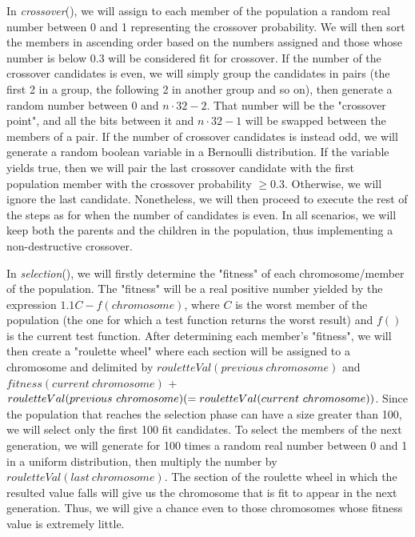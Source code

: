 \documentclass[a4paper]{article}
\begin{document}
In {\itshape crossover}(), we will assign to each member of the population a random real number between 0 and 1 representing the crossover probability. We will then sort the members in ascending order based on the numbers assigned and those whose number is below $0.3$ will be considered fit for crossover. If the number of the crossover candidates is even, we will simply group the candidates in pairs (the first 2 in a group, the following 2 in another group and so on), then generate a random number between $0$ and $n \cdot 32 - 2$. That number will be the "crossover point", and all the bits between it and $n \cdot 32 -1$ will be swapped between the members of a pair. If the number of crossover candidates is instead odd, we will generate a random boolean variable in a Bernoulli distribution. If the variable yields true, then we will pair the last crossover candidate with the first population member with the crossover probability $\geq 0.3$. Otherwise, we will ignore the last candidate. Nonetheless, we will then proceed to execute the rest of the steps as for when the number of candidates is even. In all scenarios, we will keep both the parents and the children in the population, thus implementing a non-destructive crossover.

In {\itshape selection}(), we will firstly determine the "fitness" of each chromosome/member of the population. The "fitness" will be a real positive number yielded by the expression $1.1 C - f(chromosome)$, where $C$ is the worst member of the population (the one for which a test function returns the worst result) and $f()$ is the current test function. After determining each member's "fitness", we will then create a "roulette wheel" where each section will be assigned \linebreak to a chromosome and delimited by $ rouletteVal(previous\ chromosome) $ and $ fitness(current\ chromosome) $ + $rouletteVal(previous\ chromosome) \linebreak (=rouletteVal(current\ chromosome))$. Since the population that reaches the selection phase can have a size greater than 100, we will select only the first 100 fit candidates. To select the members of the next generation, we will generate for 100 times a random real number between 0 and 1 in a uniform distribution, then multiply the number by $rouletteVal(last\ chromosome)$. The section of the roulette wheel in which the resulted value falls will give us the chromosome that is fit to appear in the next generation. Thus, we will give a chance even to those chromosomes whose fitness value is extremely little.
\end{document}
